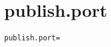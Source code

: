 \section{publish.port}
\label{configuration:PublishPort}
\AvailableInCsharpOnly{\TODO}
\begin{lstlisting}[style=Props,caption={Usage example for \textit{publish.port}}]
publish.port=
\end{lstlisting}